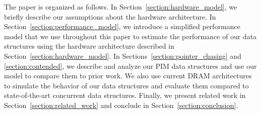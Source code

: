 The paper is organized as follows. In
Section~\ref{section:hardware_model}, we briefly describe our
assumptions about the hardware architecture.  In
Section~\ref{section:performance_model}, we introduce a simplified
performance model that we use throughout this paper to estimate the
performance of our data structures using the hardware architecture
described in Section~\ref{section:hardware_model}.  In
Sections~\ref{section:pointer_chasing} and \ref{section:contended}, we
describe and analyze our PIM data structures and use our model to
compare them to prior work.  We also use current DRAM architectures to
simulate the behavior of our data structures and evaluate them
compared to state-of-the-art concurrent data structures.  Finally, we
present related work in Section~\ref{section:related_work} and
conclude in Section~\ref{section:conclusion}.

